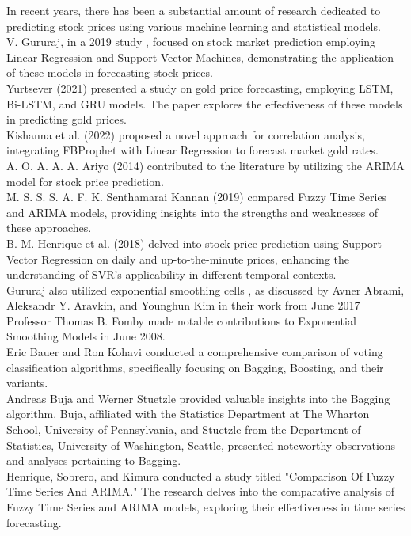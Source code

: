 \documentclass{ieeeojies}
\begin{document}
In recent years, there has been a substantial amount of research dedicated to predicting stock prices using various machine learning and statistical models. \\
V. Gururaj, in a 2019 study \cite{b1}, focused on stock market prediction employing Linear Regression and Support Vector Machines, demonstrating the application of these models in forecasting stock prices.\\
Yurtsever (2021)\cite{b2} presented a study on gold price forecasting, employing LSTM, Bi-LSTM, and GRU models. The paper explores the effectiveness of these models in predicting gold prices.\\
Kishanna et al. (2022) \cite{b3} proposed a novel approach for correlation analysis, integrating FBProphet with Linear Regression to forecast market gold rates.\\
A. O. A. A. A. Ariyo (2014)\cite{b4} contributed to the literature by utilizing the ARIMA model for stock price prediction.\\
M. S. S. S. A. F. K. Senthamarai Kannan (2019)\cite{b5} compared Fuzzy Time Series and ARIMA models, providing insights into the strengths and weaknesses of these approaches.\\
B. M. Henrique et al. (2018)\cite{b6} delved into stock price prediction using Support Vector Regression on daily and up-to-the-minute prices, enhancing the understanding of SVR's applicability in different temporal contexts.\\
Gururaj also utilized exponential smoothing cells \cite{b7} , as discussed by Avner Abrami, Aleksandr Y. Aravkin, and Younghun Kim in their work from June 2017\\
Professor Thomas B. Fomby \cite{b8} made notable contributions to Exponential Smoothing Models in June 2008. \\
Eric Bauer and Ron Kohavi conducted a comprehensive comparison of voting classification algorithms, specifically focusing on Bagging, Boosting, and their variants. \cite{b9}\\
Andreas Buja and Werner Stuetzle \cite{b10} provided valuable insights into the Bagging algorithm. Buja, affiliated with the Statistics Department at The Wharton School, University of Pennsylvania, and Stuetzle from the Department of Statistics, University of Washington, Seattle, presented noteworthy observations and analyses pertaining to Bagging.\\
Henrique, Sobrero, and Kimura \cite{b11} conducted a study titled "Comparison Of Fuzzy Time Series And ARIMA." The research delves into the comparative analysis of Fuzzy Time Series and ARIMA models, exploring their effectiveness in time series forecasting. \\
\end{document}
